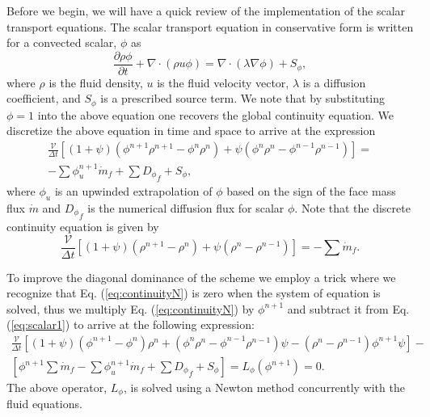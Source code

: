 \documentclass[letterpaper,twoside]{article}
\def\V{\mathcal{V}}
\begin{document}
Before we begin, we will have a quick review of the implementation of
the scalar transport equations. The scalar transport equation in
conservative form is written for a convected scalar, $\phi$ as
\begin{equation}
\frac{\partial \rho \phi}{\partial t} + \nabla \cdot (\rho u \phi) = \nabla\cdot(\lambda \nabla \phi) + S_\phi,
\end{equation}
where $\rho$ is the fluid density, $u$ is the fluid velocity vector,
$\lambda$ is a diffusion coefficient, and $S_\phi$ is a prescribed
source term.  We note that by substituting $\phi=1$ into the above
equation one recovers the global continuity equation.  We discretize
the above equation in time and space to arrive at the expression
\begin{eqnarray}
\frac{\V}{\Delta t} \left[ (1+\psi)(\phi^{n+1}\rho^{n+1}-\phi^n\rho^n) + \psi(\phi^n\rho^n-\phi^{n-1}\rho^{n-1})\right ] = \\\nonumber
 -\sum\phi^{n+1}_u\dot{m}_f + \sum{D_\phi}_f + S_\phi,
\label{eq:scalar1}
\end{eqnarray}
where $\phi_u$ is an upwinded extrapolation of $\phi$ based on the
sign of the face mass flux $\dot{m}$ and ${D_\phi}_f$ is the numerical
diffusion flux for scalar $\phi$.  Note that the discrete continuity equation is given by
\begin{equation}
\frac{\V}{\Delta t} \left[ (1+\psi)(\rho^{n+1}-\rho^n) + \psi(\rho^n-\rho^{n-1})\right ] = - \sum\dot{m}_f.
\label{eq:continuityN}
\end{equation}

To improve the diagonal dominance of the scheme we employ a trick
where we recognize that Eq. (\ref{eq:continuityN}) is zero when
the system of equation is solved, thus we multiply Eq.
(\ref{eq:continuityN}) by $\phi^{n+1}$ and subtract it from Eq.
(\ref{eq:scalar1}) to arrive at the following expression:
\begin{eqnarray}
\frac{\V}{\Delta t} \left[ \left(1+\psi\right)\left(\phi^{n+1}-\phi^n\right)\rho^n + \left(\phi^n\rho^n-\phi^{n-1}\rho^{n-1}\right)\psi-\left(\rho^n-\rho^{n-1}\right)\phi^{n+1}\psi\right ] - \\\nonumber
\left[\phi^{n+1}\sum\dot{m}_f-\sum\phi^{n+1}_u\dot{m}_f + \sum{D_\phi}_f + S_\phi\right] =L_\phi(\phi^{n+1}) = 0.
\label{eq:scalar2}
\end{eqnarray}
The above operator, $L_\phi$, is solved using a Newton method
concurrently with the fluid equations.  
\end{document}
